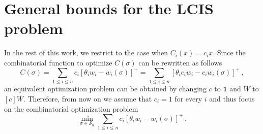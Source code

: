 \documentclass[12pt,twoside,reqno]{amsart}
\theoremstyle{definition}
\numberwithin{equation}{section}
\newcommand{\be}{\begin{equation}}
\newcommand{\ee}{\end{equation}}
\newcommand{\mc}{\mathcal}
\newcommand{\0}{\mathbf{0}}
\newcommand{\1}{\mathbf{1}}
\renewcommand{\S}{\mathcal{S} }
\newcommand{\R}{\mathbb{R}}
\newcommand{\infl}{h}
\newcommand{\Infl}{\mathbf{\infl}}
\newcommand{\thre}{\theta}
\begin{document}
%


\section{General bounds for the LCIS problem}
In the rest of this work, we restrict to the case when $C_i(x)=c_ix$. Since the combinatorial function to optimize $C(\sigma)$ can be rewritten as follows
$$C(\sigma)=\sum\limits_{1\le i\le n}c_i[\thre_iw_i-w_i(\sigma)]^+=\sum\limits_{1\le i\le n}[\thre_ic_iw_i-c_iw_i(\sigma)]^+\,,$$
an equivalent optimization problem can be obtained by changing $c$ to $\1$ and $W$ to $[c]W$. Therefore, from now on we assume that $c_i=1$ for every $i$ and thus focus on the combinatorial optimization problem
\be\label{comb-opt} \min\limits_{\sigma \in \mc S_{n}} \sum\limits_{1\le i\le n}c_i[\thre_iw_i-w_i(\sigma)]^+\,.\ee
\end{document}
